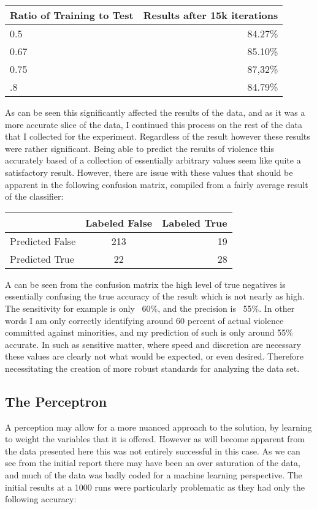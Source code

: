 \documentclass[12pt]{article}
\begin{document}
\begin{center}
\begin{tabular}{l|r}
Ratio of Training to Test & Results after 15k iterations\\
\hline
0.5  & 84.27\% \\
0.67 & 85.10\% \\
0.75 & 87,32\% \\
.8   & 84.79\%
\end{tabular}
\end{center}

	As can be seen this significantly affected the results of the data, and as it was a more accurate slice of the data, I continued this process on the rest of the data that I collected for the experiment. Regardless of the result however these results were rather significant. Being able to predict the results of violence this accurately based of a collection of essentially arbitrary values seem like quite a satisfactory result. However, there are issue with these values that should be apparent in the following confusion matrix, compiled from a fairly average result of the classifier:

\begin{center}
\begin{tabular}{l|c|r}
 & Labeled False & Labeled True\\
\hline
Predicted False & 213 & 19 \\
Predicted True & 22 & 28
\end{tabular}
\end{center}

	A can be seen from the confusion matrix the high level of true negatives is essentially confusing the true accuracy of the result which is not nearly as high. The sensitivity for example is only ~60\%, and the precision is ~55\%. In other words I am only correctly identifying around 60 percent of actual violence committed against minorities, and my prediction of such is only around 55\% accurate. In such as sensitive matter, where speed and discretion are necessary these values are clearly not what would be expected, or even desired. Therefore necessitating the creation of more robust standards for analyzing the data set.

\subsection{The Perceptron}
	A perception may allow for a more nuanced approach to the solution, by learning to weight the variables that it is offered. However as will become apparent from the data presented here this was not entirely successful in this case. As we can see from the initial report there may have been an over saturation of the data, and much of the data was badly coded for a machine learning perspective. The initial results at a 1000 runs were particularly problematic as they had only the following accuracy:
\end{document}
